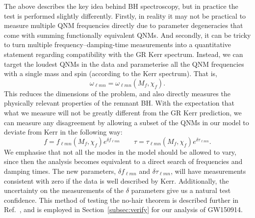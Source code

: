 The above describes the key idea behind BH spectroscopy, but in practice the test is performed slightly differently.
Firstly, in reality it may not be practical to measure multiple QNM frequencies directly due to parameter degeneracies that come with summing functionally equivalent QNMs.
And secondly, it can be tricky to turn multiple frequency--damping-time measurements into a quantitative statement regarding compatibility with the GR Kerr spectrum.
Instead, we can target the loudest QNMs in the data and parameterise all the QNM frequencies with a single mass and spin (according to the Kerr spectrum).
That is,
\begin{equation}
    \omega_{\ell m n} = \omega_{\ell m n}(M_f, \chi_f).
\end{equation}
This reduces the dimensions of the problem, and also directly measures the physically relevant properties of the remnant BH.
With the expectation that what we measure will not be greatly different from the GR Kerr prediction, we can measure any disagreement by allowing a subset of the QNMs in our model to deviate from Kerr in the following way:
\begin{equation}
    f = f_{\ell m n}(M_f, \chi_f) e^{\delta f_{\ell m n}} \qquad \tau = \tau_{\ell m n}(M_f, \chi_f) e^{\delta \tau_{\ell m n}}.
\end{equation}
We emphasise that not all the modes in the model should be allowed to vary, since then the analysis becomes equivalent to a direct search of frequencies and damping times.
The new parameters, $\delta f_{\ell m n}$ and $\delta \tau_{\ell m n}$, will have measurements consistent with zero if the data is well described by Kerr.
Additionally, the uncertainty on the measurements of the $\delta$ parameters give us a natural test confidence. 
This method of testing the no-hair theorem is described further in Ref.~\cite{Isi:2021iql}, and is employed in Section~\ref{subsec:verify} for our analysis of GW150914.
